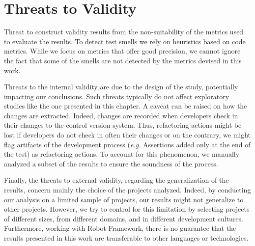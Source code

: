 \section{Threats to Validity}

Threat to construct validity results from the non-suitability of the metrics used to evaluate the results. To detect test smells we rely on heuristics based on code metrics. While we focus on metrics that offer good precision, we cannot ignore the fact that some of the smells are not detected by the metrics devised in this work.

Threats to the internal validity are due to the design of the study, potentially impacting our conclusions. Such threats typically do not affect exploratory studies like the one presented in this chapter. A caveat can be raised on how the changes are extracted. Indeed, changes are recorded when developers check in their changes to the control version system. Thus, refactoring actions might be lost if developers do not check in often their changes or on the contrary, we might flag artifacts of the development process (\emph{e.g.} Assertions added only at the end of the test) as refactoring actions. To account for this phenomenon, we manually analyzed a subset of the results to ensure the soundness of the process.

Finally, the threats to external validity, regarding the generalization of the results, concern mainly the choice of the projects analyzed. Indeed, by conducting our analysis on a limited sample of projects, our results might not generalize to other projects. However, we try to control for this limitation by selecting projects of different sizes, from different domains, and in different development cultures. Furthermore, working with Robot Framework, there is no guarantee that the results presented in this work are transferable to other languages or technologies.